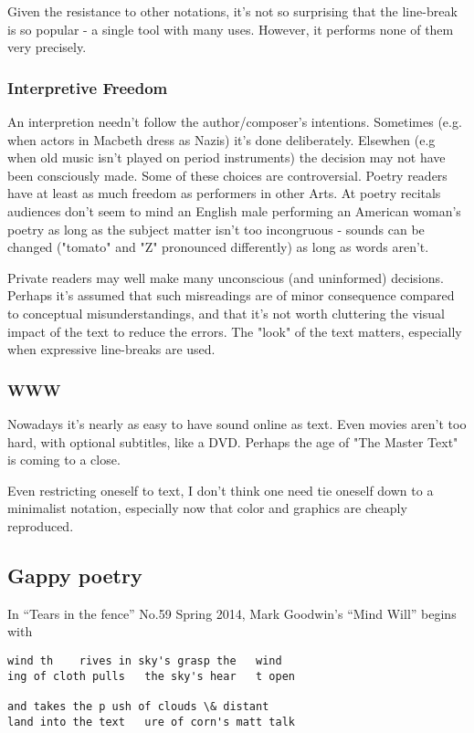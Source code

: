 \documentclass[11pt]{article}
\begin{document}
Given the resistance to other notations, it's not so surprising that 
the line-break is so popular - a single tool with many uses. However, it 
performs none of them very precisely.

\subsubsection*{Interpretive Freedom}

An interpretion needn't follow the author/composer's intentions. Sometimes
(e.g. when actors in Macbeth dress as Nazis) it's done deliberately. 
Elsewhen (e.g when old music isn't played on period instruments) the
decision may not have been consciously made. Some of these choices are
controversial. Poetry readers have at least as much freedom as performers
in other Arts. At poetry recitals audiences don't seem to mind an
English male performing an American woman's poetry as long as the subject
matter isn't too incongruous - sounds can be changed ("tomato" and "Z"
pronounced differently) as long as words aren't. 

Private readers may well make 
many unconscious (and uninformed) decisions. Perhaps it's assumed that
such misreadings are of minor consequence compared to conceptual
misunderstandings, and that it's not worth cluttering the visual 
impact of the text to reduce the errors. The "look" of the text matters,
especially when expressive line-breaks are used.


\subsubsection*{WWW}

Nowadays it's nearly as easy to have sound online as text. Even movies 
aren't too hard, with optional subtitles, like a DVD. Perhaps the age of
"The Master Text" is coming to a close. 


Even restricting oneself to text, I don't think one need tie oneself down to 
a minimalist notation, especially now that color and graphics are cheaply 
reproduced. 

\newpage\subsection{Gappy poetry}
In ``Tears in the fence'' No.59 Spring 2014, Mark Goodwin's ``Mind Will'' begins with
\begin{verbatim}
wind th    rives in sky's grasp the   wind
ing of cloth pulls   the sky's hear   t open

and takes the p ush of clouds \& distant
land into the text   ure of corn's matt talk
\end{verbatim}
\end{document}
